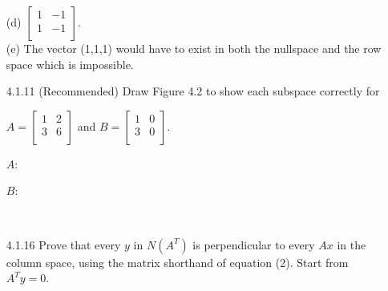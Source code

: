 \documentclass[10pt,twoside,reqno]{article}
\begin{document}
\begin{enumerate}
{(d) 
$
\begin{bmatrix}
1&-1\\
1&-1\\
\end{bmatrix}
$. \\
(e) The vector (1,1,1) would have to exist in both the nullspace and the row space which is impossible. \\
}
\vspace{3mm}
\item[4.1.11] (Recommended) Draw Figure 4.2 to show each subspace correctly for \\
\begin{center}
$
A=
\begin{bmatrix}
1&2\\
3&6\\
\end{bmatrix}
$
 and 
$
B=
\begin{bmatrix}
1&0\\
3&0\\
\end{bmatrix}
$.
\end{center}
\vspace{3mm}
{\addtolength{\leftskip}{10mm}
$A$: 
\hspace{10mm}
$B$: 
 \\
}
\vspace{3mm}
\item[4.1.16] Prove that every $y$ in $N(A^T)$ is perpendicular to every $Ax$ in the column space, using the matrix shorthand of equation (2). Start from $A^Ty = 0$. 

\end{enumerate}
\end{document}
